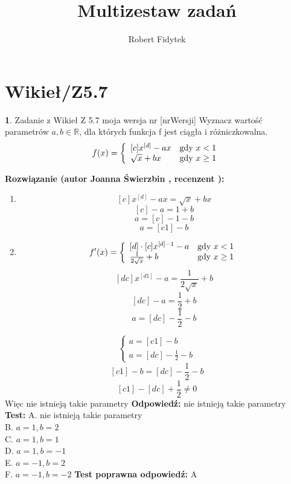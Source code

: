\documentclass[12pt, a4paper]{article}
\title{Multizestaw zadań}
\author{Robert Fidytek}
\date{}
\theoremstyle{definition} %
\newtheorem{zad}{}
\newcommand{\kategoria}[1]{\section{#1}} %
\newcommand{\zadStart}[1]{\begin{zad}#1\newline} %
\newcommand{\zadStop}{\end{zad}}   %
\newcommand{\rozwStart}[2]{\noindent \textbf{Rozwiązanie (autor #1 , recenzent #2): }\newline} %
\newcommand{\rozwStop}{\newline}                                            %
\newcommand{\odpStart}{\noindent \textbf{Odpowiedź:}\newline}    %
\newcommand{\odpStop}{\newline}                                             %
\newcommand{\testStart}{\noindent \textbf{Test:}\newline} %
\newcommand{\testStop}{\newline} %
\newcommand{\kluczStart}{\noindent \textbf{Test poprawna odpowiedź:}\newline} %
\newcommand{\kluczStop}{\newline} %
\begin{document}
\maketitle


\kategoria{Wikieł/Z5.7}
\zadStart{Zadanie z Wikieł Z 5.7 moja wersja nr [nrWersji]}
Wyznacz wartość parametrów $a,b \in \mathbb{R}$, dla których funkcja f jest ciągła i różniczkowalna.
$$
f(x) = \left\{ \begin{array}{ll}
[c]x^{[d]}-ax & \textrm{gdy $x<1$}\\
\sqrt{x}+bx & \textrm{gdy $ x\geq 1$}
\end{array} \right.
$$
\zadStop
\rozwStart{Joanna Świerzbin}{}
\begin{enumerate}
\item $$ [c]x^{[d]}-ax = \sqrt{x}+bx $$
 $$ [c]-a =1+b $$
 $$ a =[c]-1-b $$
 $$ a =[c1]-b $$
\item 
$$
f'(x) = \left\{ \begin{array}{ll}
[d]\cdot[c]x^{[d]-1}-a & \textrm{gdy $x<1$}\\
\frac{1}{2\sqrt{x}}+b & \textrm{gdy $ x\geq 1$}
\end{array} \right.
$$
$$[dc]x^{[d1]}-a = \frac{1}{2\sqrt{x}}+b $$
$$[dc]-a = \frac{1}{2}+b $$
$$a =[dc]- \frac{1}{2}-b $$
\end{enumerate}
$$
\left\{ \begin{array}{ll}
a =[c1]-b\\
a =[dc]- \frac{1}{2}-b
\end{array} \right.
$$
$$ [c1]-b =[dc]- \frac{1}{2}-b $$
$$ [c1]-[dc]+ \frac{1}{2} \neq 0 $$
Więc nie istnieją takie parametry
\rozwStop
\odpStart
nie istnieją takie parametry
\odpStop
\testStart
A. nie istnieją takie parametry\\
B. $a=1, b=2$\\
C. $a=1, b=1$\\
D. $a=1, b=-1$\\
E. $a=-1, b=2$\\
F. $a=-1, b=-2$
\testStop
\kluczStart
A
\kluczStop
\end{document}
